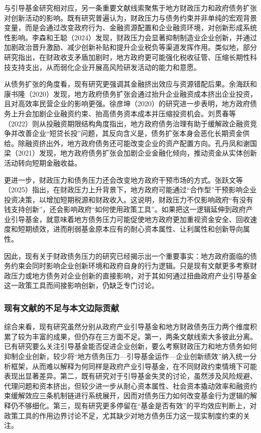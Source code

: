 与引导基金研究相对应，另一条重要文献线索聚焦于地方财政压力和政府债务扩张对创新活动的影响。既有研究普遍认为，财政压力与债务约束并非单纯的宏观背景变量，而是会通过改变政府行为、金融资源配置和企业融资环境，对创新形成系统性影响。李森和王聪（2024）发现，财政压力会显著抑制制造业企业创新，并通过加剧政治晋升激励、减少创新补贴和提升企业税负等渠道发挥作用。类似地，部分研究指出，在财政收支矛盾加剧时，地方政府更可能强化税收征管、压缩长期性科技支持支出，从而弱化企业开展高风险研发活动的能力和意愿。

从债务扩张的角度看，现有研究更强调其金融挤出效应与资源错配后果。余海跃和康书隆（2020）发现，地方政府债务扩张会通过抬升企业融资成本挤出企业投资，且对高效率民营企业的影响更强。徐彦坤（2020）的研究进一步表明，地方政府债务上升会加剧企业融资约束、抬高债务资本成本并压缩投资机会。刘贯春等（2022）则从投融资期限结构角度指出，地方政府债务治理有助于缓解政企融资竞争并改善企业“短贷长投”问题，其反向含义是，债务扩张本身会恶化长期资金供给。除融资挤出外，地方政府债务还可能改变企业的资产配置方向。孔丹凤和谢国梁（2021）发现，地方政府债务扩张会加剧企业金融化倾向，推动资金从实体创新活动转向短期金融收益。

更进一步，财政压力和债务压力还会改变地方政府干预市场的方式。张跃文等（2025）指出，在财政压力上升背景下，地方政府可能通过“合作型”干预影响企业投资决策，以增加短期税源和财政收入。这说明，财政压力不仅影响政府“有没有钱支持创新”，还会影响政府“如何使用政策工具”。如果把这一逻辑延伸到政府产业引导基金，就意味着地方债务压力可能促使地方政府更加重视资金安全、回收速度和短期绩效，进而削弱基金原本应有的耐心资本属性、让利属性和创新导向属性。

因此，现有关于财政债务压力的研究已经揭示出一个重要事实：地方政府面临的债务约束会同时影响企业创新环境和政府自身的行为逻辑。只是现有文献更多考察财政压力或地方债务对企业创新的直接影响，对于其如何通过扭曲政府产业引导基金这一政策工具而间接影响创新，仍缺乏专门讨论。

\subsubsection{现有文献的不足与本文边际贡献}

综合来看，现有研究虽然分别从政府产业引导基金和地方财政债务压力两个维度积累了较为丰富的成果，但仍存在三方面不足。第一，两条文献线索大多彼此分离。已有研究要么关注引导基金能否促进企业创新，要么考察财政压力和地方债务如何抑制企业创新，较少将“地方债务压力—引导基金运作—企业创新绩效”纳入统一分析框架，从而难以解释为何同样是政府产业引导基金，在不同财政约束情境下可能表现出显著差异。第二，既有研究对于引导基金失灵的讨论，虽然涉及风险规避、代理问题和资本挤出，但较少进一步从耐心资本属性、社会资本撬动效率和融资约束缓解效应三条机制链进行系统展开，因而对债务压力如何改变基金行为逻辑的解释仍不够细化。第三，现有研究更多停留在“基金是否有效”的平均效应判断上，对政策工具的作用边界讨论不足，尤其缺少对地方债务压力这一现实制度约束的关注。

